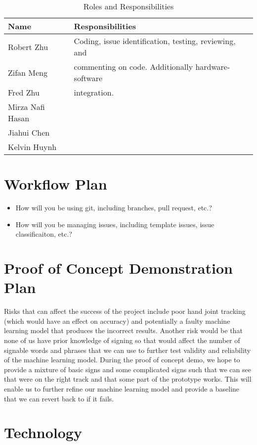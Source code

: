 \documentclass{article}
\begin{document}
\begin{table}[H]
\caption{Roles and Responsibilities} \label{TblRoles}
\begin{tabularx}{\textwidth}{ll}
\toprule
\textbf{Name} & \textbf{Responsibilities}\\
\midrule
Robert Zhu & Coding, issue identification, testing, reviewing, and \\
Zifan Meng & commenting on code. Additionally hardware-software \\
Fred Zhu & integration. \\
Mirza Nafi Hasan & \\
Jiahui Chen & \\
Kelvin Huynh & \\
\bottomrule
\end{tabularx}
\end{table}

\section{Workflow Plan}

\begin{itemize}
	\item How will you be using git, including branches, pull request, etc.?
	\item How will you be managing issues, including template issues, issue
	classificaiton, etc.?
\end{itemize}

\section{Proof of Concept Demonstration Plan}

Risks that can affect the success of the project include poor hand joint tracking
(which would have an effect on accuracy) and potentially a faulty machine learning model
that produces the incorrect results. Another risk would be that none of us have prior
knowledge of signing so that would affect the number of signable words and phrases that
we can use to further test validity and reliability of the machine learning model. During
the proof of concept demo, we hope to provide a mixture of basic signs and some complicated
signs such that we can see that we\textquotesingle re on the right track and that some part of the prototype
works. This will enable us to further refine our machine learning model and provide a
baseline that we can revert back to if it fails.

\section{Technology}
\end{document}
